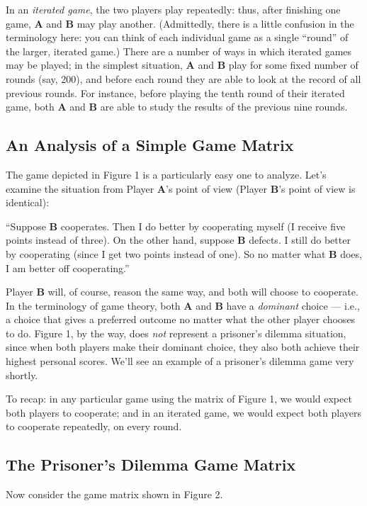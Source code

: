 In an {\it iterated game}, the two players play repeatedly: thus,
after finishing one game, {\bf A} and {\bf B} may play another.
(Admittedly, there is a little confusion in the terminology here: you
can think of each individual game as a single ``round'' of the larger,
iterated game.) There are a number of ways in which iterated games may
be played; in the simplest situation, {\bf A} and {\bf B} play for
some fixed number of rounds (say, 200), and before each round they are
able to look at the record of all previous rounds. For instance,
before playing the tenth round of their iterated game, both {\bf A}
and {\bf B} are able to study the results of the previous nine rounds.


\subsection{An Analysis of a Simple Game Matrix}

The game depicted in Figure 1 is a particularly easy one to analyze.
Let's examine the situation from Player {\bf A}'s point of view
(Player {\bf B}'s point of view is identical):

``Suppose {\bf B} cooperates. Then I do better by cooperating
myself (I receive five points instead of three). On the other
hand, suppose {\bf B} defects. I still do better by cooperating
(since I get two points instead of one). So no matter what
{\bf B} does, I am better off cooperating.''

Player {\bf B} will, of course, reason the same way, and both will
choose to cooperate. In the terminology of game theory, both {\bf A}
and {\bf B} have a {\it dominant} choice --- i.e., a choice that gives
a preferred outcome no matter what the other player chooses to do.
Figure 1, by the way, does {\it not} represent a prisoner's dilemma
situation, since when both players make their dominant choice, they
also both achieve their highest personal scores.  We'll see an example
of a prisoner's dilemma game very shortly.

To recap: in any particular game using the matrix of Figure 1, we
would expect both players to cooperate; and in an iterated game, we would
expect both players to cooperate repeatedly, on every round.

\subsection{The Prisoner's Dilemma Game Matrix}

Now consider the game matrix shown in Figure 2.

